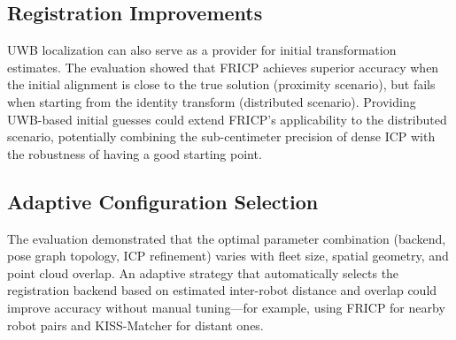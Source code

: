 \subsection{Registration Improvements}

UWB localization can also serve as a provider for initial
transformation estimates.
The evaluation showed that FRICP achieves superior accuracy when
the initial alignment is close to the true solution (proximity
scenario), but fails when starting from the identity transform
(distributed scenario).
Providing UWB-based initial guesses could extend FRICP's applicability
to the distributed scenario, potentially combining the sub-centimeter
precision of dense ICP with the robustness of having a good starting
point.

\subsection{Adaptive Configuration Selection}

The evaluation demonstrated that the optimal parameter combination
(backend, pose graph topology, ICP refinement) varies with fleet
size, spatial geometry, and point cloud overlap.
An adaptive strategy that automatically selects the registration
backend based on estimated inter-robot distance and overlap could
improve accuracy without manual tuning---for example, using FRICP
for nearby robot pairs and KISS-Matcher for distant ones.
